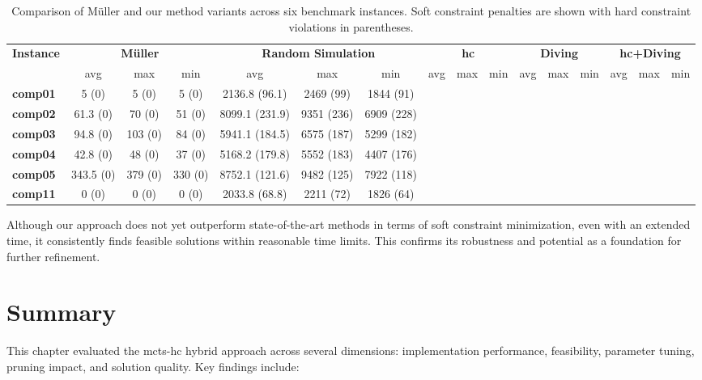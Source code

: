 \begin{landscape}
\begin{table}[p]
\centering
\setlength{\tabcolsep}{3pt}
\begin{tabular}{lccc|ccc|ccc|ccc|ccc}
\hline
\textbf{Instance}
& \multicolumn{3}{c|}{\textbf{Müller}} 
& \multicolumn{3}{c|}{\textbf{Random Simulation}} 
& \multicolumn{3}{c|}{\textbf{\ac{hc}}} 
& \multicolumn{3}{c|}{\textbf{Diving}} 
& \multicolumn{3}{c}{\textbf{\ac{hc}+Diving}} \\
& avg & max & min 
& avg & max & min 
& avg & max & min 
& avg & max & min 
& avg & max & min \\
\hline
\textbf{comp01} & 5 (0) & 5 (0) & 5 (0) & 2136.8 (96.1) & 2469 (99) & 1844 (91) & & & & & & & & & \\
\textbf{comp02} & 61.3 (0) & 70 (0) & 51 (0) & 8099.1 (231.9) & 9351 (236) & 6909 (228) & & & & & & & & & \\
\textbf{comp03} & 94.8 (0) & 103 (0) & 84 (0) & 5941.1 (184.5) & 6575 (187) & 5299 (182) & & & & & & & & & \\
\textbf{comp04} & 42.8 (0) & 48 (0) & 37 (0) & 5168.2 (179.8) & 5552 (183) & 4407 (176) & & & & & & & & & \\
\textbf{comp05} & 343.5 (0) & 379 (0) & 330 (0) & 8752.1 (121.6) & 9482 (125) & 7922 (118) & & & & & & & & & \\
\textbf{comp11} & 0 (0) & 0 (0) & 0 (0) & 2033.8 (68.8) & 2211 (72) & 1826 (64) & & & & & & & & & \\
\hline
\end{tabular}
\caption{Comparison of Müller and our method variants across six benchmark instances. Soft constraint penalties are shown with hard constraint violations in parentheses.}
\label{tab:comparison_results}
\end{table}
\end{landscape}


Although our approach does not yet outperform state-of-the-art methods in terms of soft constraint minimization, even with an extended time, it consistently finds feasible solutions within reasonable time limits. This confirms its robustness and potential as a foundation for further refinement.

\section{Summary}

This chapter evaluated the \ac{mcts}-\ac{hc} hybrid approach across several dimensions: implementation performance, feasibility, parameter tuning, pruning impact, and solution quality. Key findings include:

